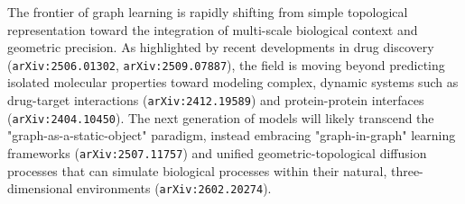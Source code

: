 \documentclass[11pt]{article}
\begin{document}
The frontier of graph learning is rapidly shifting from simple topological representation toward the integration of multi-scale biological context and geometric precision. As highlighted by recent developments in drug discovery (\texttt{arXiv:2506.01302}, \texttt{arXiv:2509.07887}), the field is moving beyond predicting isolated molecular properties toward modeling complex, dynamic systems such as drug-target interactions (\texttt{arXiv:2412.19589}) and protein-protein interfaces (\texttt{arXiv:2404.10450}). The next generation of models will likely transcend the "graph-as-a-static-object" paradigm, instead embracing "graph-in-graph" learning frameworks (\texttt{arXiv:2507.11757}) and unified geometric-topological diffusion processes that can simulate biological processes within their natural, three-dimensional environments (\texttt{arXiv:2602.20274}).
\end{document}

